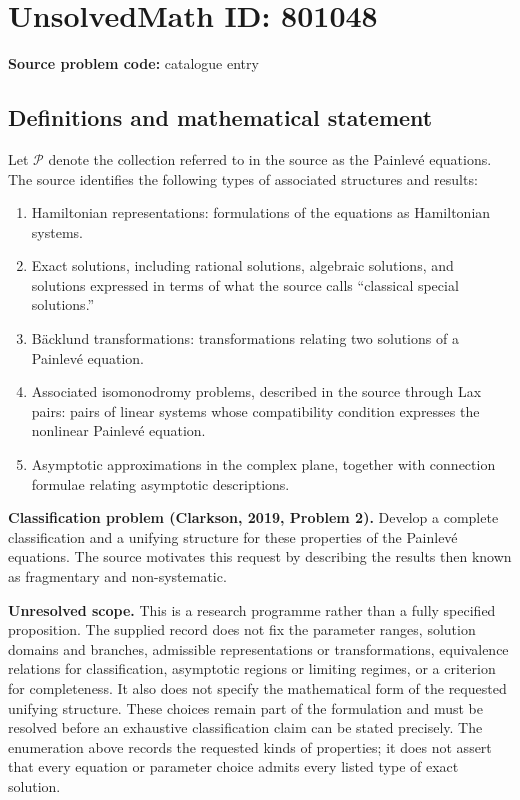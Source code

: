 \documentclass[11pt]{article}
\begin{document}
\section*{UnsolvedMath ID: 801048}
\textbf{Source problem code:} catalogue entry
\subsection{Definitions and mathematical statement}
Let \(\mathcal P\) denote the collection referred to in the source as the Painlev\'e equations. The source identifies the following types of associated structures and results:
\begin{enumerate}
\item Hamiltonian representations: formulations of the equations as Hamiltonian systems.
\item Exact solutions, including rational solutions, algebraic solutions, and solutions expressed in terms of what the source calls ``classical special solutions.''
\item B\"acklund transformations: transformations relating two solutions of a Painlev\'e equation.
\item Associated isomonodromy problems, described in the source through Lax pairs: pairs of linear systems whose compatibility condition expresses the nonlinear Painlev\'e equation.
\item Asymptotic approximations in the complex plane, together with connection formulae relating asymptotic descriptions.
\end{enumerate}
\textbf{Classification problem (Clarkson, 2019, Problem 2).} Develop a complete classification and a unifying structure for these properties of the Painlev\'e equations. The source motivates this request by describing the results then known as fragmentary and non-systematic.

\textbf{Unresolved scope.} This is a research programme rather than a fully specified proposition. The supplied record does not fix the parameter ranges, solution domains and branches, admissible representations or transformations, equivalence relations for classification, asymptotic regions or limiting regimes, or a criterion for completeness. It also does not specify the mathematical form of the requested unifying structure. These choices remain part of the formulation and must be resolved before an exhaustive classification claim can be stated precisely. The enumeration above records the requested kinds of properties; it does not assert that every equation or parameter choice admits every listed type of exact solution.
\end{document}
